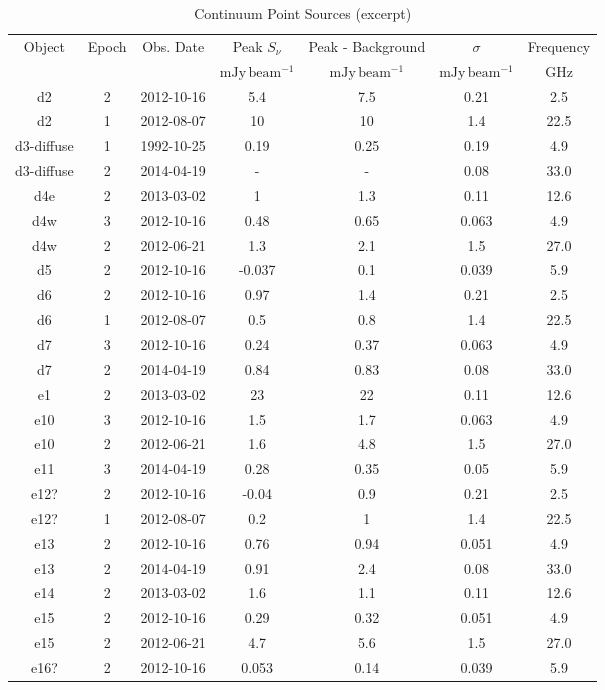 \begin{table*}[htp]
\caption{Continuum Point Sources (excerpt)}
\begin{tabular}{ccccccc}
\label{tab:contsrcs}
Object & Epoch & Obs. Date & Peak $S_{\nu}$ & Peak - Background & $\sigma$ & Frequency \\
 &  &  & $\mathrm{mJy\,beam^{-1}}$ & $\mathrm{mJy\,beam^{-1}}$ & $\mathrm{mJy\,beam^{-1}}$ & $\mathrm{GHz}$ \\
\hline
d2 & 2 & 2012-10-16 & 5.4 & 7.5 & 0.21 & 2.5 \\
d2 & 1 & 2012-08-07 & 10 & 10 & 1.4 & 22.5 \\
d3-diffuse & 1 & 1992-10-25 & 0.19 & 0.25 & 0.19 & 4.9 \\
d3-diffuse & 2 & 2014-04-19 & - & - & 0.08 & 33.0 \\
d4e & 2 & 2013-03-02 & 1 & 1.3 & 0.11 & 12.6 \\
d4w & 3 & 2012-10-16 & 0.48 & 0.65 & 0.063 & 4.9 \\
d4w & 2 & 2012-06-21 & 1.3 & 2.1 & 1.5 & 27.0 \\
d5 & 2 & 2012-10-16 & -0.037 & 0.1 & 0.039 & 5.9 \\
d6 & 2 & 2012-10-16 & 0.97 & 1.4 & 0.21 & 2.5 \\
d6 & 1 & 2012-08-07 & 0.5 & 0.8 & 1.4 & 22.5 \\
d7 & 3 & 2012-10-16 & 0.24 & 0.37 & 0.063 & 4.9 \\
d7 & 2 & 2014-04-19 & 0.84 & 0.83 & 0.08 & 33.0 \\
e1 & 2 & 2013-03-02 & 23 & 22 & 0.11 & 12.6 \\
e10 & 3 & 2012-10-16 & 1.5 & 1.7 & 0.063 & 4.9 \\
e10 & 2 & 2012-06-21 & 1.6 & 4.8 & 1.5 & 27.0 \\
e11 & 3 & 2014-04-19 & 0.28 & 0.35 & 0.05 & 5.9 \\
e12? & 2 & 2012-10-16 & -0.04 & 0.9 & 0.21 & 2.5 \\
e12? & 1 & 2012-08-07 & 0.2 & 1 & 1.4 & 22.5 \\
e13 & 2 & 2012-10-16 & 0.76 & 0.94 & 0.051 & 4.9 \\
e13 & 2 & 2014-04-19 & 0.91 & 2.4 & 0.08 & 33.0 \\
e14 & 2 & 2013-03-02 & 1.6 & 1.1 & 0.11 & 12.6 \\
e15 & 2 & 2012-10-16 & 0.29 & 0.32 & 0.051 & 4.9 \\
e15 & 2 & 2012-06-21 & 4.7 & 5.6 & 1.5 & 27.0 \\
e16? & 2 & 2012-10-16 & 0.053 & 0.14 & 0.039 & 5.9 \\

\end{tabular}
\end{table*}
